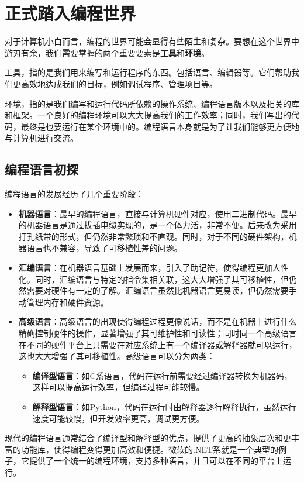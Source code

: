 \chapter{正式踏入编程世界}\label{chap:coding}

对于计算机小白而言，编程的世界可能会显得有些陌生和复杂。要想在这个世界中游刃有余，我们需要掌握的两个重要要素是\textbf{工具}和\textbf{环境}。

工具，指的是我们用来编写和运行程序的东西。包括语言、编辑器等。它们帮助我们更高效地达成我们的目标，例如调试程序、管理项目等。

环境，指的是我们编写和运行代码所依赖的操作系统、编程语言版本以及相关的库和框架。一个良好的编程环境可以大大提高我们的工作效率；同时，我们写出的代码，最终是也要运行在某个环境中的。编程语言本身就是为了让我们能够更方便地与计算机进行交流。

\section{编程语言初探}

\begin{reading}[编程语言发展简史]
  编程语言的发展经历了几个重要阶段：

\begin{itemize}
  \item \textbf{机器语言}：最早的编程语言，直接与计算机硬件对应，使用二进制代码。最早的机器语言是通过拔插电缆实现的，是一个体力活，非常不便。后来改为采用打孔纸带的形式，但仍然非常繁琐和不直观。同时，对于不同的硬件架构，机器语言也不兼容，导致了可移植性差的问题。
  \item \textbf{汇编语言}：在机器语言基础上发展而来，引入了助记符，使得编程更加人性化。同时，汇编语言与特定的指令集相关联，这大大增强了其可移植性，但仍然需要对硬件有一定的了解。汇编语言虽然比机器语言更易读，但仍然需要手动管理内存和硬件资源。
  \item \textbf{高级语言}：高级语言的出现使得编程过程更像说话，而不是在机器上进行什么精确控制硬件的操作，显著增强了其可维护性和可读性；同时同一个高级语言在不同的硬件平台上只需要在对应系统上有一个编译器或解释器就可以运行，这也大大增强了其可移植性。高级语言可以分为两类：
    \begin{itemize}
      \item \textbf{编译型语言}：如C系语言，代码在运行前需要经过编译器转换为机器码，这样可以提高运行效率，但编译过程可能较慢。
      \item \textbf{解释型语言}：如Python，代码在运行时由解释器逐行解释执行，虽然运行速度可能较慢，但开发效率更高，调试更方便。
    \end{itemize}
\end{itemize}

现代的编程语言通常结合了编译型和解释型的优点，提供了更高的抽象层次和更丰富的功能库，使得编程变得更加高效和便捷。微软的.NET系就是一个典型的例子，它提供了一个统一的编程环境，支持多种语言，并且可以在不同的平台上运行。

\end{reading}

